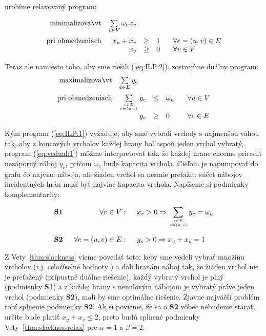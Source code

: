 \noindent
urobíme relaxovaný program:

\begin{equation}
\begin{array}{rrcll}
  {\rm minimalizovať}     & \multicolumn{1}{l}{\sum\limits_{v\in V}\omega_vx_v}\\[3ex]
  {\rm pri\ obmedzeniach} & x_u + x_v&\ge&1& \;\;\;\forall e=(u,v)\in E\\
                          & x_v&\ge&0& \;\;\;\forall v\in V\\
\end{array}
\end{equation}

\setcounter{equation}{\tmp}

\noindent
Teraz ale namiesto toho, aby sme riešili (\ref{eq:ILP:2}), zostrojíme duálny program: 
\begin{equation}
  \label{eq:vcdual:1}
\begin{array}{rrcll}
  {\rm maximalizovať}     & \multicolumn{1}{l}{\sum\limits_{e\in E}y_e}\\[3ex]
  {\rm pri\ obmedzeniach} & \sum\limits_{e\in E\atop e=(u,v)}y_e&\le&\omega_u& \;\;\;\forall u\in V\\[3ex]
                          & y_e&\ge&0& \;\;\;\forall e\in E\\
\end{array}
\end{equation}

\noindent
Kým program (\ref{eq:ILP:1}) vyžaduje, aby sme vybrali vrcholy s najmenšou váhou tak, aby z koncových vrcholov
každej hrany bol aspoň jeden vrchol vybratý, program (\ref{eq:vcdual:1}) môžme interpretovať tak, že
každej hrane chceme priradiť nezáporný náboj $y_e$, pričom $\omega_v$ bude kapacita vrchola. 
Cieľom je napumpovať do grafu čo najviac náboja, ale
žiaden vrchol sa nesmie preťažiť: súčet nábojov incidentných hrán musí byť najviac kapacita vrchola.
Napíšeme si podmienky komplementarity:

$$\begin{array}{lrl}
  {\bf S1} \;\;&\forall v\in V:\;\;&x_v>0\Rightarrow
  \displaystyle\sum\limits_{e\in E\atop e=(u,v)}y_e=\omega_u\\[6ex]
  {\bf S2} \;\;&\forall e=(u,v)\in E:\;\; & y_e>0\Rightarrow x_u+x_v=1
\end{array}$$

\noindent
Z Vety~\ref{thm:slackness} vieme povedať toto: keby sme vedeli vybrať množinu vrcholov 
(t.j. celočíselné hodnoty )
a dali hranám náboj tak, že žiaden vrchol nie je preťažený (prípustné duálne riešenie), každý vybratý
vrchol je plný (podmienky {\bf S1}) a 
z každej hrany s nenulovým nábojom je vybratý práve jeden vrchol (podmienky 
{\bf S2}), mali by sme optimálne riešenie.
Zjavne najväčší problém robí splnenie podmienky {\bf S2}. Ak si povieme, že sa o {\bf S2} vôbec nebudeme starať,
určite bude platiť $x_u+x_v\le2$, preto budú splnené podmienky Vety~\ref{thm:slacknessrelax} pre $\alpha=1$ a 
$\beta=2$.


